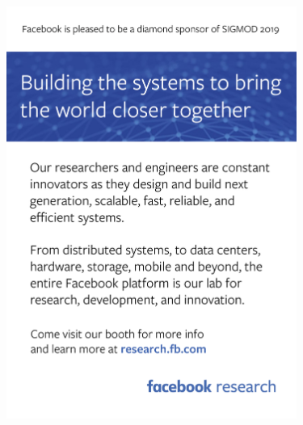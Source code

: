
\clearpage


\ifthispageodd{\hbox{}\newpage}{}





\thispagestyle{empty}
\includegraphics[width=95mm]{ads/facebook.pdf}


